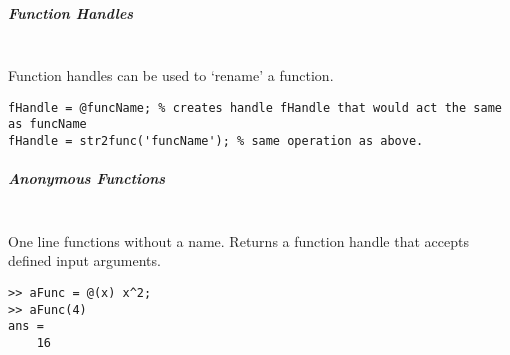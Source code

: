 \documentclass[12pt]{article}
\begin{document}
\subparagraph{Function Handles} \ \\
Function handles can be used to `rename' a function.

\begin{verbatim}
fHandle = @funcName; % creates handle fHandle that would act the same as funcName
fHandle = str2func('funcName'); % same operation as above.
\end{verbatim}

\subparagraph{Anonymous Functions} \ \\
One line functions without a name. 
Returns a function handle that accepts defined input arguments.
\begin{verbatim}
>> aFunc = @(x) x^2;
>> aFunc(4)
ans =
    16
\end{verbatim}
\end{document}
